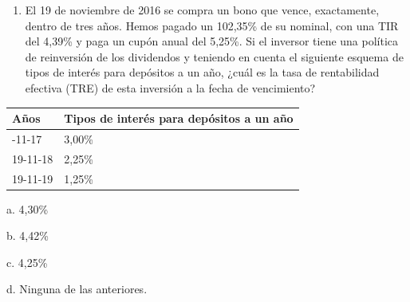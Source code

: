 \documentclass[
  letterpaper,
  DIV=11,
  numbers=noendperiod]{scrartcl}
\providecommand{\tightlist}{%
  \setlength{\itemsep}{0pt}\setlength{\parskip}{0pt}}\usepackage{longtable,booktabs,array}
\begin{document}
\begin{enumerate}
\def\labelenumi{\arabic{enumi}.}
\setcounter{enumi}{1}
\tightlist
\item
  El 19 de noviembre de 2016 se compra un bono que vence, exactamente,
  dentro de tres años. Hemos pagado un 102,35\% de su nominal, con una
  TIR del 4,39\% y paga un cupón anual del 5,25\%. Si el inversor tiene
  una política de reinversión de los dividendos y teniendo en cuenta el
  siguiente esquema de tipos de interés para depósitos a un año, ¿cuál
  es la tasa de rentabilidad efectiva (TRE) de esta inversión a la fecha
  de vencimiento?
\end{enumerate}

\begin{longtable}[]{@{}ll@{}}
\toprule\noalign{}
Años & Tipos de interés para depósitos a un año \\
\midrule\noalign{}
\endhead
\bottomrule\noalign{}
\endlastfoot
19-11-17 & 3,00\% \\
19-11-18 & 2,25\% \\
19-11-19 & 1,25\% \\
\end{longtable}

a. 4,30\%

b. 4,42\%

c. 4,25\%

d. Ninguna de las anteriores.
\end{document}
